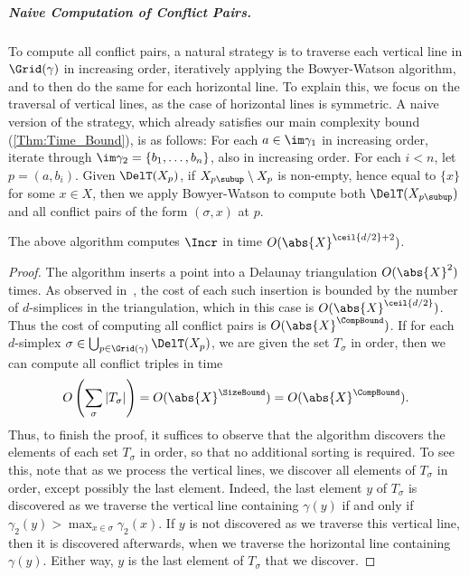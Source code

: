 %
\subparagraph{Naive Computation of Conflict Pairs.}
To compute all conflict pairs, a natural strategy is to traverse each vertical line in $\Grid(\gamma)$ in increasing order, iteratively applying the Bowyer-Watson algorithm, and to then do the same for each horizontal line.  To explain this, we focus on the traversal of vertical lines, as the case of horizontal lines is symmetric.  A naive version of the strategy, which already satisfies our main complexity bound (\cref{Thm:Time_Bound}), is as follows: For each $a\in \im \gamma_1$ in increasing order, iterate through $\im \gamma_2=\{b_1,\ldots,b_n\}$, also in increasing order.  For each $i < n$, let $p=(a,b_i)$.   Given $\DelT(X_{p})$,  if $X_{p{\subup}}\setminus X_{p}$ is non-empty, hence equal to $\{x\}$ for some $x\in X$, then we apply Bowyer-Watson to compute both $\DelT(X_{p{\subup}})$ and all conflict pairs of the form $(\sigma,x)$ at $p$.  
%
\begin{theorem}\label{Thm:Time_Bound}
The above algorithm computes $\Incr$ in time $O(\abs{X}^{\ceil{d/2}+2})$.
\end{theorem}
\begin{proof}
The algorithm inserts a point into a Delaunay triangulation $O(\abs{X}^{2})$ times.  As observed in~\cite[Section 2]{alonsoDelaunayBifiltrationsFunctions2024},  the cost of each such insertion is bounded by the number of $d$-simplices in the triangulation, which in this case is $O(\abs{X}^{\ceil{d/2}})$.  Thus the cost of computing all conflict pairs is $O(\abs{X}^\CompBound)$.  
%
If for each $d$-simplex $\sigma\in \bigcup_{p\in \Grid(\gamma)} \DelT(X_p)$, we are given the set $T_{\sigma}$ in order, then we can compute all conflict triples in time \[O\left(\sum_{\sigma} |T_{\sigma}|\right)=O(\abs{X}^{\SizeBound})=O(\abs{X}^\CompBound).\]  Thus, to finish the proof, it suffices to observe that the algorithm discovers the elements of each set $T_{\sigma}$ in order, so that no additional sorting is required.  To see this, note that as we process the vertical lines, we discover all elements of $T_{\sigma}$ in order,  except possibly the last element.  Indeed, the last element $y$ of $T_{\sigma}$ is discovered as we traverse the vertical line containing $\gamma(y)$ if and only if $\gamma_2(y)> \max_{x\in \sigma} \gamma_2(x)$.  If $y$ is not discovered as we traverse this vertical line, then it is discovered afterwards, when we traverse the horizontal line containing $\gamma(y)$.  Either way, $y$ is the last element of $T_{\sigma}$ that we discover.
\end{proof}
%
%
%
